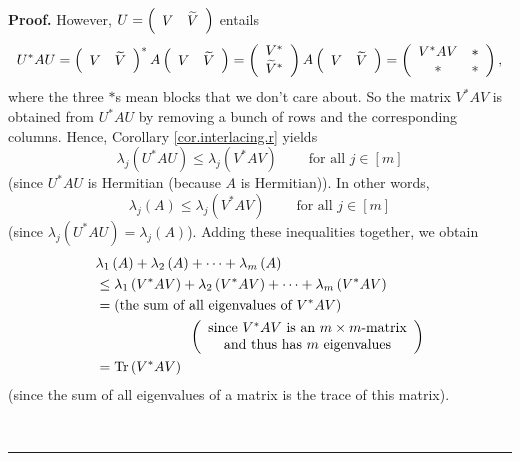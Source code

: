 \documentclass[numbers=enddot,12pt,final,onecolumn,notitlepage]{scrartcl}%
\numberwithin{exer}{subsection}
\theoremstyle{definition}
\newenvironment{proof}[1][Proof]{\noindent\textbf{#1.} }{\ \rule{0.5em}{0.5em}}
\begin{document}
\begin{proof}
However, $U=\left(
\begin{array}
[c]{cc}%
V & \widetilde{V}%
\end{array}
\right)  $ entails%
\[
U^{\ast}AU=\left(
\begin{array}
[c]{cc}%
V & \widetilde{V}%
\end{array}
\right)  ^{\ast}A\left(
\begin{array}
[c]{cc}%
V & \widetilde{V}%
\end{array}
\right)  =\left(
\begin{array}
[c]{c}%
V^{\ast}\\
\widetilde{V}^{\ast}%
\end{array}
\right)  A\left(
\begin{array}
[c]{cc}%
V & \widetilde{V}%
\end{array}
\right)  =\left(
\begin{array}
[c]{cc}%
V^{\ast}AV & \ast\\
\ast & \ast
\end{array}
\right)  ,
\]
where the three $\ast$s mean blocks that we don't care about. So the matrix
$V^{\ast}AV$ is obtained from $U^{\ast}AU$ by removing a bunch of rows and the
corresponding columns. Hence, Corollary \ref{cor.interlacing.r} yields%
\[
\lambda_{j}\left(  U^{\ast}AU\right)  \leq\lambda_{j}\left(  V^{\ast
}AV\right)  \ \ \ \ \ \ \ \ \ \ \text{for all }j\in\left[  m\right]
\]
(since $U^{\ast}AU$ is Hermitian (because $A$ is Hermitian)). In other words,%
\[
\lambda_{j}\left(  A\right)  \leq\lambda_{j}\left(  V^{\ast}AV\right)
\ \ \ \ \ \ \ \ \ \ \text{for all }j\in\left[  m\right]
\]
(since $\lambda_{j}\left(  U^{\ast}AU\right)  =\lambda_{j}\left(  A\right)
$). Adding these inequalities together, we obtain%
\begin{align*}
&  \lambda_{1}\left(  A\right)  +\lambda_{2}\left(  A\right)  +\cdots
+\lambda_{m}\left(  A\right) \\
&  \leq\lambda_{1}\left(  V^{\ast}AV\right)  +\lambda_{2}\left(  V^{\ast
}AV\right)  +\cdots+\lambda_{m}\left(  V^{\ast}AV\right) \\
&  =\left(  \text{the sum of all eigenvalues of }V^{\ast}AV\right) \\
&  \ \ \ \ \ \ \ \ \ \ \ \ \ \ \ \ \ \ \ \ \left(
\begin{array}
[c]{c}%
\text{since }V^{\ast}AV\text{ is an }m\times m\text{-matrix}\\
\text{and thus has }m\text{ eigenvalues}%
\end{array}
\right) \\
&  =\operatorname*{Tr}\left(  V^{\ast}AV\right)
\end{align*}
(since the sum of all eigenvalues of a matrix is the trace of this matrix).


\end{proof}
\end{document}
